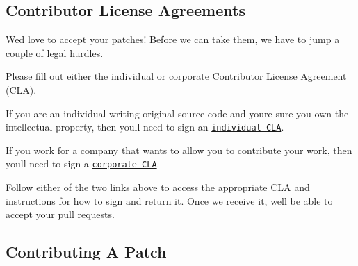 \subsection*{Contributor License Agreements}

We\textquotesingle{}d love to accept your patches! Before we can take them, we have to jump a couple of legal hurdles.

Please fill out either the individual or corporate Contributor License Agreement (C\+LA).


\begin{DoxyItemize}
\item If you are an individual writing original source code and you\textquotesingle{}re sure you own the intellectual property, then you\textquotesingle{}ll need to sign an \href{https://developers.google.com/open-source/cla/individual}{\tt individual C\+LA}.
\item If you work for a company that wants to allow you to contribute your work, then you\textquotesingle{}ll need to sign a \href{https://developers.google.com/open-source/cla/corporate}{\tt corporate C\+LA}.
\end{DoxyItemize}

Follow either of the two links above to access the appropriate C\+LA and instructions for how to sign and return it. Once we receive it, we\textquotesingle{}ll be able to accept your pull requests.

\subsection*{Contributing A Patch}


